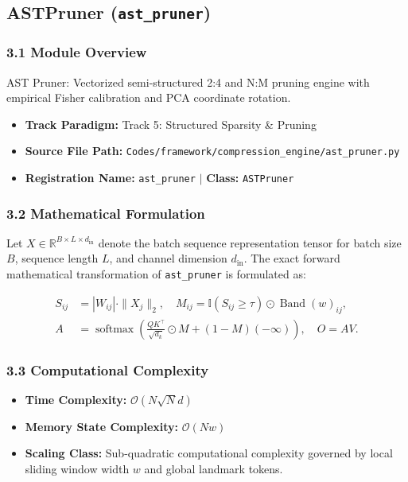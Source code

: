 \subsection{ASTPruner (\texttt{ast\_pruner})}
\label{sec:app_module_ast\_pruner}

\subsubsection*{3.1 Module Overview}
AST Pruner: Vectorized semi-structured 2:4 and N:M pruning engine with empirical Fisher calibration and PCA coordinate rotation.
\begin{itemize}
    \item \textbf{Track Paradigm:} Track 5: Structured Sparsity & Pruning
    \item \textbf{Source File Path:} \texttt{Codes/framework/compression\_engine/ast\_pruner.py}
    \item \textbf{Registration Name:} \texttt{ast\_pruner} $\mid$ \textbf{Class:} \texttt{ASTPruner}
\end{itemize}

\subsubsection*{3.2 Mathematical Formulation}
Let $X \in \mathbb{R}^{B \times L \times d_{\text{in}}}$ denote the batch sequence representation tensor for batch size $B$, sequence length $L$, and channel dimension $d_{\text{in}}$. The exact forward mathematical transformation of \texttt{ast\_pruner} is formulated as:

\begin{align}
S_{ij} &= |W_{ij}| \cdot \|X_j\|_2, \quad M_{ij} = \mathbb{I}(S_{ij} \ge \tau) \odot \operatorname{Band}(w)_{ij}, \\
A &= \operatorname{softmax}\left(\frac{Q K^\top}{\sqrt{d_k}} \odot M + (1 - M)(-\infty)\right), \quad O = A V.
\end{align}


\subsubsection*{3.3 Computational Complexity}
\begin{itemize}
    \item \textbf{Time Complexity:} $\mathcal{O}(N \sqrt{N} d)$
    \item \textbf{Memory State Complexity:} $\mathcal{O}(N w)$
    \item \textbf{Scaling Class:} Sub-quadratic computational complexity governed by local sliding window width $w$ and global landmark tokens.
\end{itemize}

